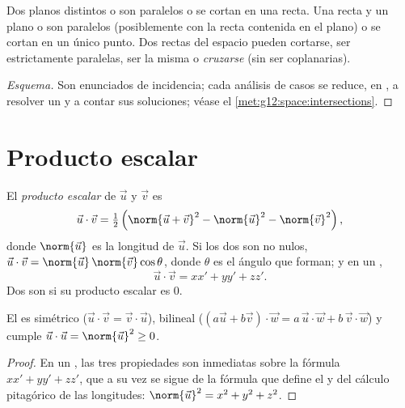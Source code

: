 \begin{proposition}\label{prop:g12:space:positions}
Dos planos distintos o son paralelos o se cortan en una recta. Una recta y
un plano o son paralelos (posiblemente con la recta contenida en el plano)
o se cortan en un único punto. Dos rectas del espacio pueden cortarse, ser
estrictamente paralelas, ser la misma o \emph{cruzarse} (sin ser
coplanarias).
\end{proposition}

\begin{proof}[Esquema]
Son enunciados de incidencia; cada análisis de casos se reduce, en
, a resolver un  y a contar sus soluciones; véase
el \cref{met:g12:space:intersections}.
\end{proof}

\section{Producto escalar}

\begin{definition}\label{def:g12:space:dot}
El \emph{producto escalar} de $\vec u$ y $\vec v$
es
\[
\vec u \cdot \vec v = \tfrac12\left(\norm{\vec u + \vec v}^2
- \norm{\vec u}^2 - \norm{\vec v}^2\right),
\]
donde $\norm{\vec u}$ es la longitud de $\vec u$. Si los dos  son
no nulos, $\vec u \cdot \vec v = \norm{\vec u}\,\norm{\vec v}\cos\theta$,
donde $\theta$ es el ángulo que forman; y en un 
\emph{},
\[
\vec u \cdot \vec v = xx' + yy' + zz' .
\]
Dos  son \emph{} si su producto escalar es $0$.
\end{definition}

\begin{proposition}[Propiedades]\label{prop:g12:space:dotprops}
El  es simétrico ($\vec u\cdot\vec v = \vec v\cdot\vec u$),
bilineal ($(a\vec u + b\vec v)\cdot \vec w = a\,\vec u\cdot\vec w +
b\,\vec v\cdot \vec w$) y cumple
$\vec u \cdot \vec u = \norm{\vec u}^2 \geq 0$.
\end{proposition}

\begin{proof}
En un , las tres propiedades son inmediatas sobre la
fórmula $xx' + yy' + zz'$, que a su vez se sigue de la fórmula que define
el  y del cálculo pitagórico de las longitudes:
$\norm{\vec u}^2 = x^2 + y^2 + z^2$.
\end{proof}

